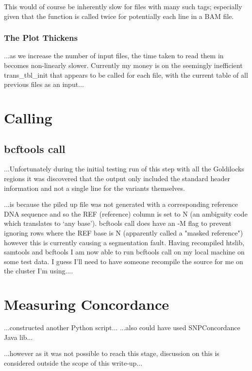 This would of course be inherently slow for files with many such tags;
especially given that the function is called twice for potentially each line in
a BAM file.


\subsubsection{The Plot Thickens}

...as we increase the number of input files, the time taken to
read them in becomes non-linearly slower. Currently my money is on the seemingly
inefficient trans\_tbl\_init that appears to be called for each file, with the
current table of all previous files as an input...


\section{Calling}
\subsection{bcftools call}

...Unfortunately during the initial testing run of this step with all the
Goldilocks regions it was discovered that the output only included the standard
header information and not a single line for the variants themselves.

...is because the piled up file was not generated with a corresponding reference
DNA sequence and so the REF (reference) column is set to N (an ambiguity code
which translates to ‘any base’).  bcftools call does have an -M flag to prevent
ignoring rows where the REF base is N (apparently called a "masked reference")
however this is currently causing a segmentation fault.  Having recompiled
htslib, samtools and bcftools I am now able to run bcftools call on my local
machine on some test data. I guess I’ll need to have someone recompile the
source for me on the cluster I’m using....


\section{Measuring Concordance}

...constructed another Python script...
...also could have used SNPConcordance Java lib...

...however as it was not possible to reach this stage, discussion on this is
considered outside the scope of this write-up...
